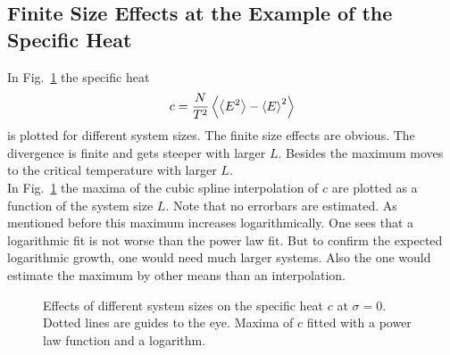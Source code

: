\subsection{Finite Size Effects at the Example of the Specific Heat}
\label{appendix:finiteSizeEffects}
    In Fig.\ \ref{fig:smeared_out_appendix} the specific heat
    \begin{equation}
        c = \frac{N}{T^2}\left< \left< E^2 \right> - \left< E \right>^2 \right>
    \end{equation}
    is plotted for different system sizes. The finite size effects are obvious.
    The divergence is finite and gets steeper with larger \(L\). Besides
    the maximum moves to the critical temperature with larger \(L\).\\
    In Fig.\ \ref{fig:smeared_out_appendix} the maxima of the
    cubic spline interpolation of \(c\) are plotted as a function of the
    system size \(L\). Note that no errorbars
    are estimated. As mentioned before
    this maximum increases logarithmically. One sees that a logarithmic
    fit is not worse than the power law fit. But to confirm the expected
    logarithmic growth, one would need much larger systems. Also the one
    would estimate the maximum by other means than an interpolation.
    \begin{figure}[htbp]
        \centering
        \caption[Finite Size Effects by Example of the Specific Heat]
        {
             Effects of different system sizes on the specific heat \(c\)
            at \(\sigma = 0\). Dotted lines are guides to the eye.
             Maxima of \(c\) fitted
            with a power law function and a logarithm.
        }
        \label{fig:smeared_out_appendix}
    \end{figure}
